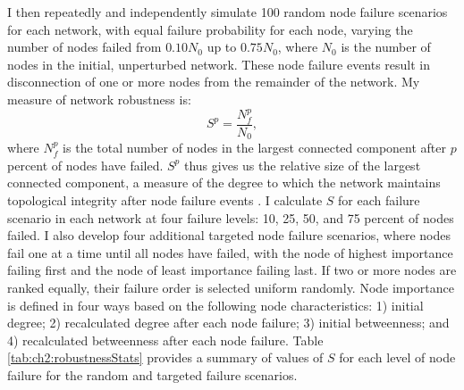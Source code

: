 
I then repeatedly and independently simulate 100 random node failure scenarios for each network, with equal failure probability for each node, varying the number of nodes failed from $0.10 N_0$ up to $0.75 N_0$, where $N_0$ is the number of nodes in the initial, unperturbed network. These node failure events result in disconnection of one or more nodes from the remainder of the network. My measure of network robustness is:
%
\begin{equation}
S^p = \frac{N^p_f}{N_0},
\end{equation} 
%
where $N^p_f$ is the total number of nodes in the largest connected component after $p$ percent of nodes have failed. $S^p$ thus gives us the relative size of the largest connected component, a measure of the degree to which the network maintains topological integrity after node failure events \cite{Albert2000}. I calculate $S$ for each failure scenario in each network at four failure levels: 10, 25, 50, and 75 percent of nodes failed. I also develop four additional targeted node failure scenarios, where nodes fail one at a time until all nodes have failed, with the node of highest importance failing first and the node of least importance failing last.  If two or more nodes are ranked equally, their failure order is selected uniform randomly. Node importance is defined in four ways based on the following node characteristics: 1) initial degree; 2) recalculated degree after each node failure; 3) initial betweenness; and  4) recalculated betweenness after each node failure. Table \ref{tab:ch2:robustnessStats} provides a summary of values of $S$ for each level of node failure for the random and targeted failure scenarios.


